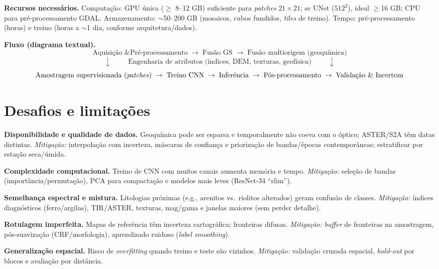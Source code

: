 \documentclass[12pt,a4paper]{article}
\begin{document}
\textbf{Recursos necessários.} Computação: GPU única ($\geq$ 8--12 GB) suficiente para \emph{patches} $21\times 21$; se UNet ($512^2$), ideal $\geq$16 GB; CPU para pré-processamento GDAL. Armazenamento: $\sim$50--200 GB (mosaicos, cubos fundidos, \emph{tiles} de treino). Tempo: pré-processamento (horas) e treino (horas a $\sim$1 dia, conforme arquitetura/dados).

\textbf{Fluxo (diagrama textual).}
\[
\text{Aquisição \& Pré-processamento} \;\rightarrow\; \text{Fusão GS} \;\rightarrow\; \text{Fusão multiorigem (geoquímica)}
\]
\[
\downarrow \hspace{1cm} \text{Engenharia de atributos (índices, DEM, texturas, geofísica)} \hspace{1cm} \downarrow
\]
\[
\text{Amostragem supervisionada (\emph{patches})} \;\rightarrow\; \text{Treino CNN} \;\rightarrow\; \text{Inferência} \;\rightarrow\; \text{Pós-processamento} \;\rightarrow\; \text{Validação \& Incerteza}
\]

\section{Desafios e limitações}
\textbf{Disponibilidade e qualidade de dados.} Geoquímica pode ser esparsa e temporalmente não coeva com o óptico; ASTER/S2A têm datas distintas. \textit{Mitigação:} interpolação com incerteza, máscaras de confiança e priorização de bandas/épocas contemporâneas; estratificar por estação seca/úmida.

\textbf{Complexidade computacional.} Treino de CNN com muitos canais aumenta memória e tempo. \textit{Mitigação:} seleção de bandas (importância/permutação), PCA para compactação e modelos mais leves (ResNet-34 ``slim'').

\textbf{Semelhança espectral e mistura.} Litologias próximas (e.g., arenitos vs.\ riolitos alterados) geram confusão de classes. \textit{Mitigação:} índices diagnósticos (ferro/argilas), TIR/ASTER, texturas, mag/gama e janelas maiores (sem perder detalhe).

\textbf{Rotulagem imperfeita.} Mapas de referência têm incerteza cartográfica; fronteiras difusas. \textit{Mitigação:} \textit{buffer} de fronteiras na amostragem, pós-suavização (CRF/morfologia), aprendizado ruidoso (\emph{label smoothing}).

\textbf{Generalização espacial.} Risco de \emph{overfitting} quando treino e teste são vizinhos. \textit{Mitigação:} validação cruzada espacial, \emph{hold-out} por blocos e avaliação por distância.
\end{document}
